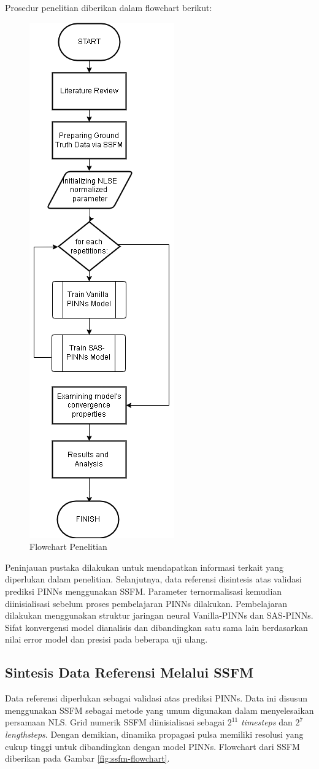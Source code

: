 Prosedur penelitian diberikan dalam flowchart berikut:

\begin{figure}[htbp]
    \centering
    \includegraphics[width=0.32\linewidth]{Gambar/FlowchartFix.png}
    \caption{Flowchart Penelitian} 
    \label{fig:main-flowchart}
\end{figure}

\newpage
Peninjauan pustaka dilakukan untuk mendapatkan informasi terkait yang diperlukan dalam penelitian. Selanjutnya, data referensi disintesis atas validasi prediksi PINNs menggunakan SSFM. Parameter ternormalisasi kemudian diinisialisasi sebelum proses pembelajaran PINNs dilakukan. Pembelajaran dilakukan menggunakan struktur jaringan neural Vanilla-PINNs dan SAS-PINNs. Sifat konvergensi model dianalisis dan dibandingkan satu sama lain berdasarkan nilai error model dan presisi pada beberapa uji ulang. 


\subsection{Sintesis Data Referensi Melalui SSFM}
Data referensi diperlukan sebagai validasi atas prediksi PINNs. Data ini disusun menggunakan SSFM sebagai metode yang umum digunakan dalam menyelesaikan persamaan NLS. Grid numerik SSFM diinisialisasi sebagai \(2^{11}\) \emph{timesteps} dan \(2^7\) \emph{lengthsteps}. Dengan demikian, dinamika propagasi pulsa memiliki resolusi yang cukup tinggi untuk dibandingkan dengan model PINNs. Flowchart dari SSFM diberikan pada Gambar \ref{fig:ssfm-flowchart}.

